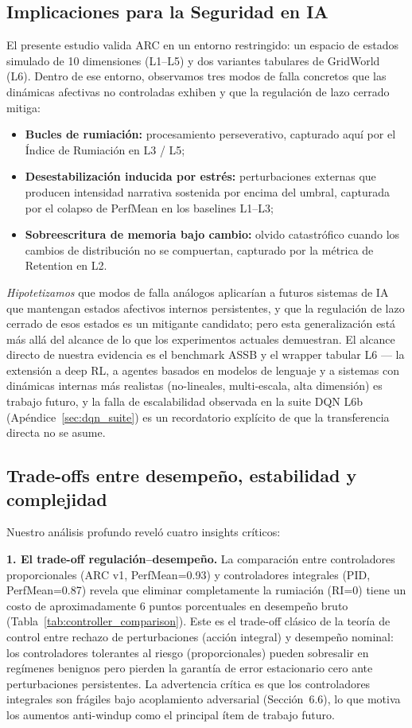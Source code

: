 \documentclass{article}
\begin{document}
\subsection{Implicaciones para la Seguridad en IA}

El presente estudio valida ARC en un entorno restringido: un espacio de estados simulado de 10 dimensiones (L1--L5) y dos variantes tabulares de GridWorld (L6). Dentro de ese entorno, observamos tres modos de falla concretos que las dinámicas afectivas no controladas exhiben y que la regulación de lazo cerrado mitiga:
\begin{itemize}
    \item \textbf{Bucles de rumiación:} procesamiento perseverativo, capturado aquí por el Índice de Rumiación en L3 / L5;
    \item \textbf{Desestabilización inducida por estrés:} perturbaciones externas que producen intensidad narrativa sostenida por encima del umbral, capturada por el colapso de PerfMean en los baselines L1--L3;
    \item \textbf{Sobreescritura de memoria bajo cambio:} olvido catastrófico cuando los cambios de distribución no se compuertan, capturado por la métrica de Retention en L2.
\end{itemize}
\emph{Hipotetizamos} que modos de falla análogos aplicarían a futuros sistemas de IA que mantengan estados afectivos internos persistentes, y que la regulación de lazo cerrado de esos estados es un mitigante candidato; pero esta generalización está más allá del alcance de lo que los experimentos actuales demuestran. El alcance directo de nuestra evidencia es el benchmark ASSB y el wrapper tabular L6 --- la extensión a deep RL, a agentes basados en modelos de lenguaje y a sistemas con dinámicas internas más realistas (no-lineales, multi-escala, alta dimensión) es trabajo futuro, y la falla de escalabilidad observada en la suite DQN L6b (Apéndice~\ref{sec:dqn_suite}) es un recordatorio explícito de que la transferencia directa no se asume.

\subsection{Trade-offs entre desempeño, estabilidad y complejidad}

Nuestro análisis profundo reveló cuatro insights críticos:

\textbf{1. El trade-off regulación--desempeño.} La comparación entre controladores proporcionales (ARC v1, PerfMean=0.93) y controladores integrales (PID, PerfMean=0.87) revela que eliminar completamente la rumiación (RI=0) tiene un costo de aproximadamente 6 puntos porcentuales en desempeño bruto (Tabla~\ref{tab:controller_comparison}). Este es el trade-off clásico de la teoría de control entre rechazo de perturbaciones (acción integral) y desempeño nominal: los controladores tolerantes al riesgo (proporcionales) pueden sobresalir en regímenes benignos pero pierden la garantía de error estacionario cero ante perturbaciones persistentes. La advertencia crítica es que los controladores integrales son frágiles bajo acoplamiento adversarial (Sección~6.6), lo que motiva los aumentos anti-windup como el principal ítem de trabajo futuro.
\end{document}
